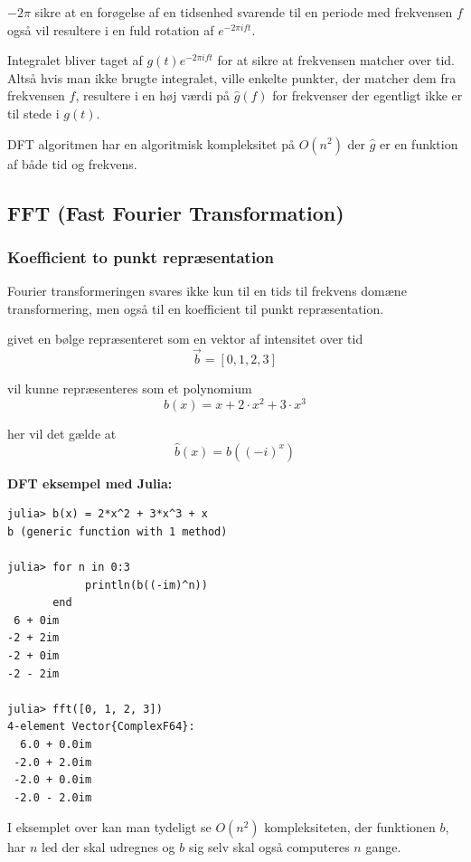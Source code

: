 \documentclass[11pt,a4paper]{article}
\begin{document}
\(-2\pi\) sikre at en forøgelse af en tidsenhed svarende til en periode med frekvensen \(f\) også vil resultere
i en fuld rotation af \(e^{-2\pi ift}\).

\bigskip

Integralet bliver taget af \(g(t)e^{-2\pi ift}\) for at sikre at frekvensen matcher over tid.
Altså hvis man ikke brugte integralet,
ville enkelte punkter, der matcher dem fra frekvensen \(f\), resultere i en høj værdi på \(\hat{g}(f)\) for frekvenser der egentligt ikke er til stede i \(g(t)\).

\bigskip

DFT algoritmen har en algoritmisk kompleksitet på \(O(n^2)\) der \(\hat{g}\) er en funktion af både tid og frekvens.

\newpage

\subsection{FFT (Fast Fourier Transformation)}
\label{sec:org62d2979}

\subsubsection{Koefficient to punkt repræsentation}
\label{sec:orgc8a8536}

Fourier transformeringen svares ikke kun til en tids til frekvens domæne transformering,
men også til en koefficient til punkt repræsentation.

\bigskip

givet en bølge repræsenteret som en vektor af intensitet over tid
$$
\vec{b} = [0, 1, 2, 3]
$$

vil kunne repræsenteres som et polynomium
$$
b(x) = x + 2\cdot x^2 + 3\cdot x^3
$$

her vil det gælde at
$$
\hat{b}(x) = b((-i)^x)
$$

\textbf{DFT eksempel med Julia:}
\begin{verbatim}
julia> b(x) = 2*x^2 + 3*x^3 + x
b (generic function with 1 method)

julia> for n in 0:3
            println(b((-im)^n))
       end
 6 + 0im
-2 + 2im
-2 + 0im
-2 - 2im

julia> fft([0, 1, 2, 3])
4-element Vector{ComplexF64}:
  6.0 + 0.0im
 -2.0 + 2.0im
 -2.0 + 0.0im
 -2.0 - 2.0im
\end{verbatim}

I eksemplet over kan man tydeligt se \(O(n^2)\) kompleksiteten,
der funktionen \(b\), har \(n\) led der skal udregnes
og \(b\) sig selv skal også computeres \(n\) gange.
\end{document}
